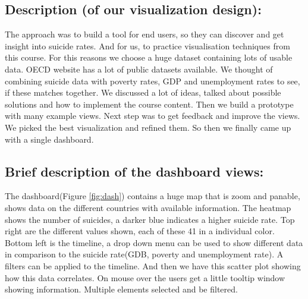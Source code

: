 \documentclass{vgtc}                          %
\begin{document}
\subsection{Description (of our visualization design):}

The approach was to build a tool for end users, so they can discover and get insight into suicide rates. And for us, to practice visualisation techniques from this course. For this reasons we choose a huge dataset containing lots of usable data. OECD website has a lot of public datasets available. We thought of combining suicide data with poverty rates, GDP and unemployment rates to see, if these matches together.
We discussed a lot of ideas, talked about possible solutions and how to implement the course content. Then we build a prototype with many example views. 
Next step was to get feedback and improve the views. We picked the best visualization and refined them. So then we finally came up with a single dashboard.


\subsection{Brief description of the dashboard views:}

The dashboard(Figure \ref{fig:dash}) contains a huge map that is zoom and panable, shows data on the different countries with available information. The heatmap shows the number of suicides, a darker blue indicates a higher suicide rate. 
Top right are the different values shown, each of these 41 in a individual color.
Bottom left is the timeline, a drop down menu can be used to show different data in comparison to the suicide rate(GDB, poverty and unemployment rate). A filters can be applied to the timeline. And then we have this scatter plot showing how this data correlates. On mouse over the users get a little tooltip window showing information.
Multiple elements selected and be filtered.
\end{document}
